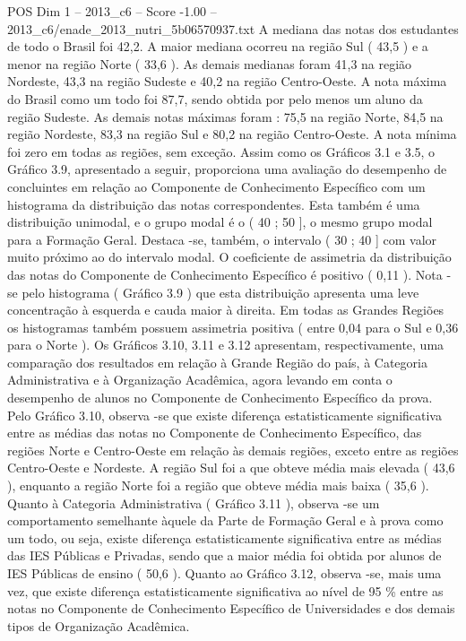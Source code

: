 \begin{textsample}{POS Dim 1 – 2013\_c6 – Score -1.00 – 2013\_c6/enade\_2013\_nutri\_5b06570937.txt}
A mediana das notas dos estudantes de todo o Brasil foi 42,2.
A maior mediana ocorreu na região Sul ( 43,5 ) e a menor na região Norte ( 33,6 ).
As demais medianas foram 41,3 na região Nordeste, 43,3 na região Sudeste e 40,2 na região Centro-Oeste.
A nota máxima do Brasil como um todo foi 87,7, sendo obtida por pelo menos um aluno da região Sudeste.
As demais notas máximas foram : 75,5 na região Norte, 84,5 na região Nordeste, 83,3 na região Sul e 80,2 na região Centro-Oeste.
A nota mínima foi zero em todas as regiões, sem exceção.
Assim como os Gráficos 3.1 e 3.5, o Gráfico 3.9, apresentado a seguir, proporciona uma avaliação do desempenho de concluintes em relação ao Componente de Conhecimento Específico com um histograma da distribuição das notas correspondentes.
Esta também é uma distribuição unimodal, e o grupo modal é o ( 40 ; 50 ], o mesmo grupo modal para a Formação Geral.
Destaca -se, também, o intervalo ( 30 ; 40 ] com valor muito próximo ao do intervalo modal.
O coeficiente de assimetria da distribuição das notas do Componente de Conhecimento Específico é positivo ( 0,11 ).
Nota -se pelo histograma ( Gráfico 3.9 ) que esta distribuição apresenta uma leve concentração à esquerda e cauda maior à direita.
Em todas as Grandes Regiões os histogramas também possuem assimetria positiva ( entre 0,04 para o Sul e 0,36 para o Norte ).
Os Gráficos 3.10, 3.11 e 3.12 apresentam, respectivamente, uma comparação dos resultados em relação à Grande Região do país, à Categoria Administrativa e à Organização Acadêmica, agora levando em conta o desempenho de alunos no Componente de Conhecimento Específico da prova.
Pelo Gráfico 3.10, observa -se que existe diferença estatisticamente significativa entre as médias das notas no Componente de Conhecimento Específico, das regiões Norte e Centro-Oeste em relação às demais regiões, exceto entre as regiões Centro-Oeste e Nordeste.
A região Sul foi a que obteve média mais elevada ( 43,6 ), enquanto a região Norte foi a região que obteve média mais baixa ( 35,6 ).
Quanto à Categoria Administrativa ( Gráfico 3.11 ), observa -se um comportamento semelhante àquele da Parte de Formação Geral e à prova como um todo, ou seja, existe diferença estatisticamente significativa entre as médias das IES Públicas e Privadas, sendo que a maior média foi obtida por alunos de IES Públicas de ensino ( 50,6 ).
Quanto ao Gráfico 3.12, observa -se, mais uma vez, que existe diferença estatisticamente significativa ao nível de 95 \% entre as notas no Componente de Conhecimento Específico de Universidades e dos demais tipos de Organização Acadêmica.

\end{textsample}
